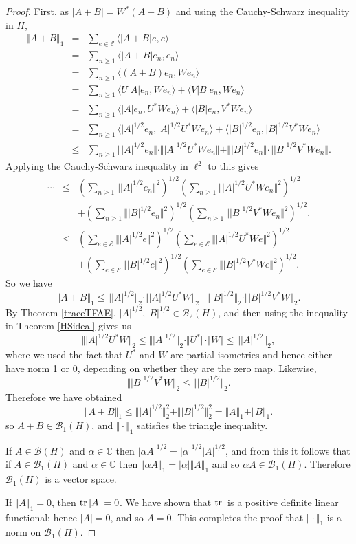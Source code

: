 \documentclass{article}
\newcommand{\inner}[2]{\langle #1, #2 \rangle}
\newcommand{\tr}{\ensuremath\mathrm{tr}\,}
\newcommand{\norm}[1]{\Vert #1 \Vert}
\begin{document}
\begin{proof}
First,
as $|A+B|=W^*(A+B)$ and using the Cauchy-Schwarz inequality in $H$,
\begin{eqnarray*}
\norm{A+B}_1&=&\sum_{e \in \mathscr{E}} \inner{|A+B|e}{e}\\
&=&\sum_{n \geq 1} \inner{|A+B|e_n}{e_n}\\
&=&\sum_{n \geq 1} \inner{(A+B)e_n}{We_n}\\
&=&\sum_{n \geq 1} \inner{U|A|e_n}{We_n}+\inner{V|B|e_n}{We_n}\\
&=&\sum_{n \geq 1} \inner{|A|e_n}{U^*We_n}+\inner{|B|e_n}{V^*We_n}\\
&=&\sum_{n \geq 1} \inner{|A|^{1/2}e_n}{|A|^{1/2}U^*We_n}+\inner{|B|^{1/2}e_n}{|B|^{1/2}V^*We_n}\\
&\leq&\sum_{n \geq 1} \norm{|A|^{1/2}e_n} \cdot \norm{|A|^{1/2}U^*We_n} + \norm{|B|^{1/2}e_n} \cdot \norm{|B|^{1/2}V^*We_n}.
\end{eqnarray*}
Applying the Cauchy-Schwarz inequality in $\ell^2$ to this gives
\begin{eqnarray*}
\cdots&\leq&\left( \sum_{n \geq 1}  \norm{|A|^{1/2}e_n}^2 \right)^{1/2} \left( \sum_{n \geq 1} \norm{|A|^{1/2}U^*We_n}^2 \right)^{1/2}\\
&&+\left(\sum_{n \geq 1} \norm{|B|^{1/2}e_n}^2 \right)^{1/2} \left(  \sum_{n \geq 1}  \norm{|B|^{1/2}V^*We_n}^2 \right)^{1/2}.\\
&\leq&\left( \sum_{e \in \mathscr{E}}  \norm{|A|^{1/2}e}^2 \right)^{1/2} \left( \sum_{e \in \mathscr{E}} \norm{|A|^{1/2}U^*We}^2 \right)^{1/2}\\
&&+\left(\sum_{e \in \mathscr{E}} \norm{|B|^{1/2}e}^2 \right)^{1/2} \left(  \sum_{e \in \mathscr{E}}  \norm{|B|^{1/2}V^*We}^2 \right)^{1/2}.
\end{eqnarray*}
So we have
\[
\norm{A+B}_1 \leq \norm{|A|^{1/2}}_2 \cdot \norm{|A|^{1/2} U^* W}_2 + \norm{|B|^{1/2}}_2 \cdot \norm{|B|^{1/2}V^*W}_2.
\]
By Theorem \ref{traceTFAE}, $|A|^{1/2}, |B|^{1/2} \in \mathscr{B}_2(H)$, and then using
 the inequality in Theorem \ref{HSideal} gives us
\[
\norm{|A|^{1/2} U^* W}_2 \leq \norm{|A|^{1/2}}_2 \cdot \norm{U^*} \cdot \norm{W} \leq \norm{|A|^{1/2}}_2,
\]
where we used the fact that $U^*$ and $W$ are partial isometries and hence either have norm 1 or 0, depending on whether they are the zero map.
Likewise,
\[
\norm{|B|^{1/2}V^*W}_2 \leq \norm{|B|^{1/2}}_2.
\]
Therefore we have obtained
\[
\norm{A+B}_1 \leq \norm{|A|^{1/2}}_2^2 + \norm{|B|^{1/2}}_2^2 = \norm{A}_1 + \norm{B}_1.
\]
so $A+B \in \mathscr{B}_1(H)$, and $\norm{\cdot}_1$ 
satisfies the triangle inequality.

If $A \in \mathscr{B}(H)$ and $\alpha \in \mathbb{C}$ then $|\alpha A|^{1/2} = |\alpha|^{1/2} |A|^{1/2}$, and from this it follows
that if $A \in \mathscr{B}_1(H)$ and $\alpha \in \mathbb{C}$ then $\norm{\alpha A}_1 = |\alpha| \norm{A}_1$ and so $\alpha A \in \mathscr{B}_1(H)$. 
Therefore $\mathscr{B}_1(H)$ is a vector space.

If $\norm{A}_1 = 0$, then $\tr|A|=0$. We have shown that $\tr$ is a positive definite linear functional: hence $|A|=0$, and so $A=0$. This completes the proof
that $\norm{\cdot}_1$ is a norm on $\mathscr{B}_1(H)$.
\end{proof}
\end{document}
